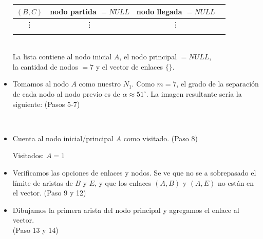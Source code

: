 \documentclass[12pt]{article}
\begin{document}
\begin{itemize}
\begin{tabular}{ c  c  c  l }
\\[-0.8em]
$(B,C)$ & nodo partida $=NULL$ & nodo llegada $=NULL$ & \\
\hline
\vdots & \vdots & \vdots &\\
\\[-0.8em]
\end{tabular}\\
La lista contiene al nodo inicial $A$, el nodo principal $=NULL$, \\la cantidad de nodos $=7$ y el vector de enlaces $\{\}$.
\pagebreak
\item Tomamos al nodo $A$ como nuestro $N_{1}$.  Como $m = 7$, el grado de la separaci\'{o}n de cada nodo al nodo previo es de $\alpha \approx 51^\circ$. La imagen resultante ser\'{i}a la siguiente: (Pasos 5-7)\\
\begin{center}
\\
\end{center}
\item Cuenta al nodo inicial/principal $A$ como visitado. (Paso 8)\\
\begin{center}
Visitados: $A=1$
\end{center}
\item Verificamos las opciones de enlaces y nodos. Se ve que no se a sobrepasado el l\'{i}mite de aristas de $B$ y $E$, y que los enlaces $(A,B)$ y $(A,E)$ no est\'{a}n en el vector. (Paso 9 y 12)
\item Dibujamos la primera arista del nodo principal y agregamos el enlace al vector.\\(Paso 13 y 14)\\
\begin{center}
\end{center}
\end{itemize}
\end{document}
